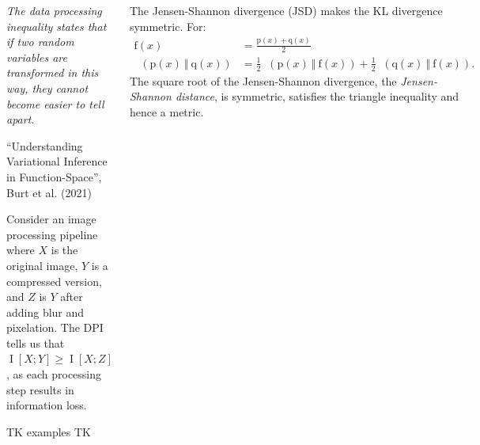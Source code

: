 \documentclass[25pt,a0paper,landscape]{tikzposter}
\begin{document}
\begin{columns}
{\begin{multicols}{2}
\columnbreak

\begin{tcolorbox}[drop fuzzy shadow southeast,enhanced,colback=brown!5!orange!40!white, colframe=brown!80!black, boxrule=1pt, left=5pt, right=5pt, top=5pt, bottom=5pt]
{\Large\emph{The data processing inequality states that if two random variables are transformed in this way, they cannot become easier to tell apart.}}
\begin{flushright}
``Understanding Variational Inference in Function-Space'', \\
Burt et al. (2021)
\end{flushright}
\end{tcolorbox}

\begin{tcolorbox}[colback=blue!5!white,colframe=blue!75!black,title=Example: Image Processing]
Consider an image processing pipeline where $X$ is the original image, $Y$ is a compressed version, and $Z$ is $Y$ after adding blur and pixelation. The DPI tells us that $\mathop{\mathrm{I}}[X;Y] \ge \mathop{\mathrm{I}}[X;Z]$, as each processing step results in information loss.
\end{tcolorbox}

TK examples TK

\end{multicols}
\begin{multicols}{2}
\begin{theorybox}[title=Jenson-Shannon Divergence DPI]
The Jensen-Shannon divergence (JSD) makes the KL divergence symmetric. For:
\begin{align*}
\mathrm{f}(x) &= \frac{\mathrm{p}(x) + \mathrm{q}(x)}{2}\\
\mathop{\mathrm{D_\mathrm{JSD}}}(\mathrm{p}(x) \:\Vert\: \mathrm{q}(x)) &= \frac{1}{2} \mathop{\mathrm{D_\mathrm{KL}}}(\mathrm{p}(x) \:\Vert\: \mathrm{f}(x)) + \frac{1}{2} \mathop{\mathrm{D_\mathrm{KL}}}(\mathrm{q}(x) \:\Vert\: \mathrm{f}(x)).
\end{align*}
The square root of the Jensen-Shannon divergence, the \emph{Jensen-Shannon distance}, is symmetric, satisfies the triangle inequality and hence a metric.


\end{theorybox}
\end{multicols}}
\end{columns}
\end{document}
